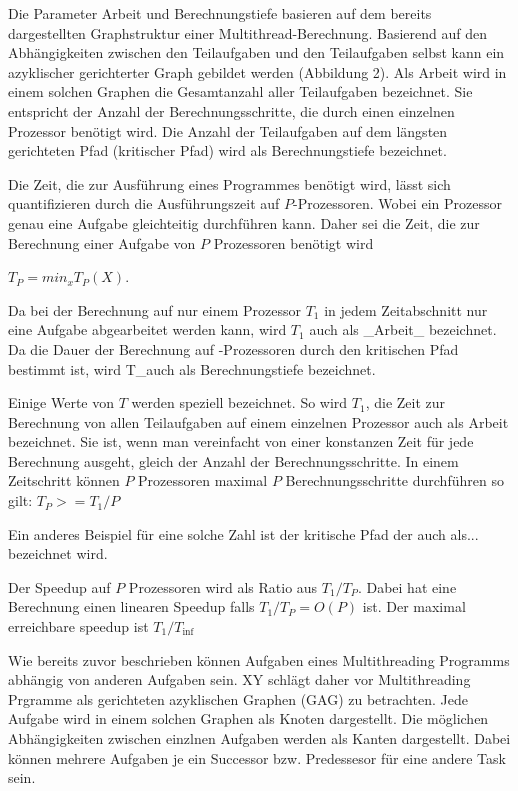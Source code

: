 Die Parameter Arbeit und Berechnungstiefe basieren auf dem bereits dargestellten Graphstruktur einer Multithread-Berechnung. Basierend auf den Abhängigkeiten zwischen den Teilaufgaben und den Teilaufgaben selbst kann ein azyklischer gerichterter Graph gebildet werden (Abbildung 2). Als Arbeit wird in einem solchen Graphen die Gesamtanzahl aller Teilaufgaben bezeichnet. Sie entspricht der Anzahl der Berechnungsschritte, die durch einen einzelnen Prozessor benötigt wird. Die Anzahl der Teilaufgaben auf dem längsten gerichteten Pfad (kritischer Pfad) wird als Berechnungstiefe bezeichnet.

Die Zeit, die zur Ausführung eines Programmes benötigt wird, lässt sich quantifizieren durch die Ausführungszeit auf $P$-Prozessoren. Wobei ein Prozessor genau eine Aufgabe gleichteitig durchführen kann. Daher sei die Zeit, die zur Berechnung einer Aufgabe von $P$ Prozessoren benötigt wird

$T_P = min_x T_P(X)$.

Da bei der Berechnung auf nur einem Prozessor $T_1$ in jedem Zeitabschnitt nur eine Aufgabe abgearbeitet werden kann, wird $T_1$ auch als _Arbeit_ bezeichnet. Da die Dauer der Berechnung auf \inf-Prozessoren durch den kritischen Pfad bestimmt ist, wird T_\inf auch als Berechnungstiefe bezeichnet.

Einige Werte von $T$ werden speziell bezeichnet. So wird $T_1$, die Zeit zur Berechnung von allen Teilaufgaben auf einem einzelnen Prozessor auch als Arbeit bezeichnet. Sie ist, wenn man vereinfacht von einer konstanzen Zeit für jede Berechnung ausgeht, gleich der Anzahl der Berechnungsschritte. In einem Zeitschritt können $P$ Prozessoren maximal $P$ Berechnungsschritte durchführen so gilt: $T_P >= T_1/P$


Ein anderes Beispiel für eine solche Zahl ist der kritische Pfad der auch als... bezeichnet wird.


Der Speedup auf $P$ Prozessoren wird als Ratio aus $T_1/T_P$. Dabei hat eine Berechnung einen linearen Speedup falls $T_1/T_P = O(P)$ ist. Der maximal erreichbare speedup ist $T_1/T_\inf$




Wie bereits zuvor beschrieben können Aufgaben eines Multithreading Programms abhängig von anderen Aufgaben sein. XY schlägt daher vor Multithreading Prgramme als gerichteten azyklischen Graphen (GAG) zu betrachten. Jede Aufgabe wird in einem solchen Graphen als Knoten dargestellt. Die möglichen Abhängigkeiten zwischen einzlnen Aufgaben werden als Kanten dargestellt. Dabei können mehrere Aufgaben je ein Successor bzw. Predessesor für eine andere Task sein.

